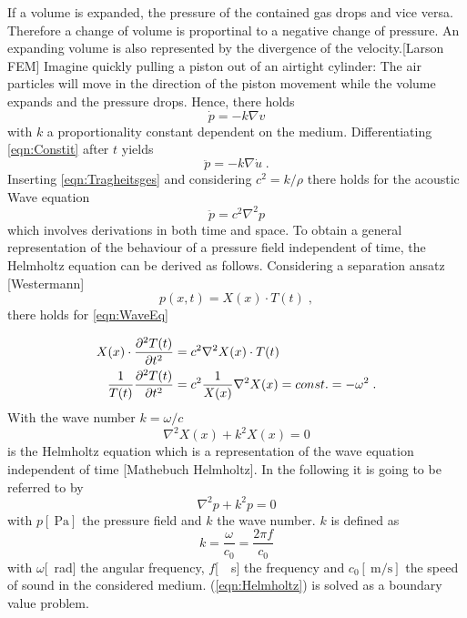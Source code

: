 \documentclass[%
  a4paper,oneside,%
  11pt,%
  smallchapters,
  green,%
  rgb, <cmyk>
  ,]{tubsbook}
\begin{document}
If a volume is expanded, the pressure of the contained gas drops and vice versa. Therefore a change of volume is proportinal to a negative change of pressure. An expanding volume is also represented by the divergence of the velocity.[Larson FEM] Imagine quickly pulling a piston out of an airtight cylinder: The air particles will move in the direction of the piston movement while the volume expands and the pressure drops. Hence, there holds
\begin{equation}
\dot{p} = -k \nabla v
\label{eqn:Constit}
\end{equation}
with $k$ a proportionality constant dependent on the medium.
Differentiating \ref{eqn:Constit} after $t$ yields 
\begin{equation}
\ddot{p} = -k \nabla \dot{u} \;.
\end{equation}
Inserting \ref{eqn:Tragheitsges} and considering $c^2 = k/\rho$ there holds for the acoustic Wave equation
\begin{equation}
\ddot{p} = c^2 \nabla^2 p 
\label{eqn:WaveEq}
\end{equation}
which involves derivations in both time and space. To obtain a general representation of the behaviour of a pressure field independent of time, the Helmholtz equation can be derived as follows.
Considering a separation ansatz [Westermann]
\begin{equation}
p(x,t) = X(x) \cdot T(t) \; ,
\end{equation}
there holds for \ref{eqn:WaveEq}

\begin{align}
X(x) \cdot \pdv[2]{T(t)}{t} &= c^2 \nabla^2 X(x) \cdot T(t)\\
\frac{1}{T(t)} \pdv[2]{T(t)}{t} &= c^2 \frac{1}{X(x)} \nabla^2 X(x) = const. = - \omega^2 \; .
\end{align}
With the wave number $k = \omega / c$ 
\begin{equation}
\nabla^2 X(x) + k^2 X(x) = 0
\end{equation}
is the Helmholtz equation which is a representation of the wave equation independent of time [Mathebuch Helmholtz].
%
In the following it is going to be referred to by
\begin{equation}
\nabla^2 p + k^2 p = 0
\label{eqn:Helmholtz}
\end{equation}
with $p [\SI{}{\pascal}]$ the pressure field and $k$ the wave number. $k$ is defined as \begin{equation}
k = \frac{\omega}{c_0} = \frac{2 \pi f}{c_0}
\end{equation}
with $\omega$[\SI{}{\radian}] the angular frequency, $f$[\SI{}{\per\s}] the frequency and $c_0[\SI{}{\metre\per\s}]$ the speed of sound in the considered medium.
(\ref{eqn:Helmholtz}) is solved as a boundary value problem.
\end{document}
